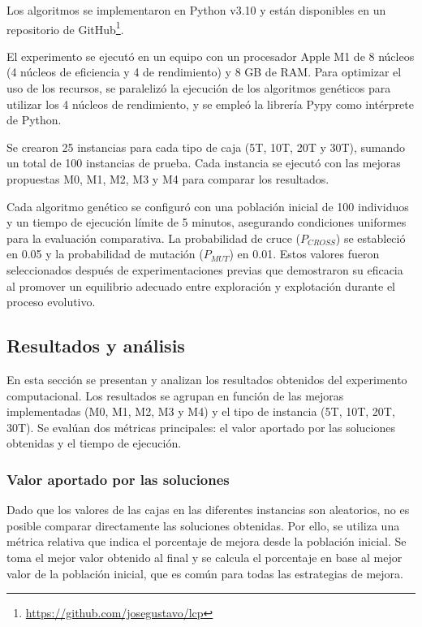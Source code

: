 Los algoritmos se implementaron en Python v3.10 y están disponibles en un repositorio de GitHub\footnote{\url{https://github.com/josegustavo/lcp}}.

El experimento se ejecutó en un equipo con un procesador Apple M1 de 8 núcleos (4 núcleos de eficiencia y 4 de rendimiento) y 8 GB de RAM. Para optimizar el uso de los recursos, se paralelizó la ejecución de los algoritmos genéticos para utilizar los 4 núcleos de rendimiento, y se empleó la librería Pypy como intérprete de Python.

Se crearon 25 instancias para cada tipo de caja (5T, 10T, 20T y 30T), sumando un total de 100 instancias de prueba. Cada instancia se ejecutó con las mejoras propuestas M0, M1, M2, M3 y M4 para comparar los resultados.

Cada algoritmo genético se configuró con una población inicial de 100 individuos y un tiempo de ejecución límite de 5 minutos, asegurando condiciones uniformes para la evaluación comparativa. La probabilidad de cruce ($P_{CROSS}$) se estableció en 0.05 y la probabilidad de mutación ($P_{MUT}$) en 0.01. Estos valores fueron seleccionados después de experimentaciones previas que demostraron su eficacia al promover un equilibrio adecuado entre exploración y explotación durante el proceso evolutivo.

\subsection{Resultados y análisis}

En esta sección se presentan y analizan los resultados obtenidos del experimento computacional. Los resultados se agrupan en función de las mejoras implementadas (M0, M1, M2, M3 y M4) y el tipo de instancia (5T, 10T, 20T, 30T). Se evalúan dos métricas principales: el valor aportado por las soluciones obtenidas y el tiempo de ejecución.

\subsubsection{Valor aportado por las soluciones}

Dado que los valores de las cajas en las diferentes instancias son aleatorios, no es posible comparar directamente las soluciones obtenidas. Por ello, se utiliza una métrica relativa que indica el porcentaje de mejora desde la población inicial. Se toma el mejor valor obtenido al final y se calcula el porcentaje en base al mejor valor de la población inicial, que es común para todas las estrategias de mejora.

